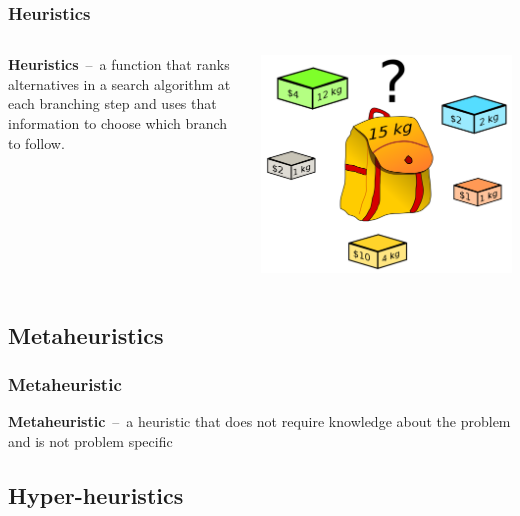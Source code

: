 \documentclass{beamer}
\newcommand{\linespace}{\vskip 0.25cm}
\begin{document}
\begin{frame}
	\frametitle{Heuristics}
	\begin{columns}
		\begin{column}{.6\textwidth}
			\textbf{Heuristics}~--~a function that ranks alternatives in a search algorithm at each branching step and uses that information to choose which branch to follow.
		\end{column}
		\begin{column}{.4\textwidth}
			\pause
			\includegraphics[height=.45\textheight]{Illustrations/knapsack.PNG}
			\\
		\end{column}
	\end{columns}
\end{frame}

\subsection{Metaheuristics}

\begin{frame}
	\frametitle{Metaheuristic}
	\textbf{Metaheuristic}~--~a heuristic that does not require knowledge about the problem and is not problem specific
	\linespace
\end{frame}

\subsection{Hyper-heuristics}
\end{document}
